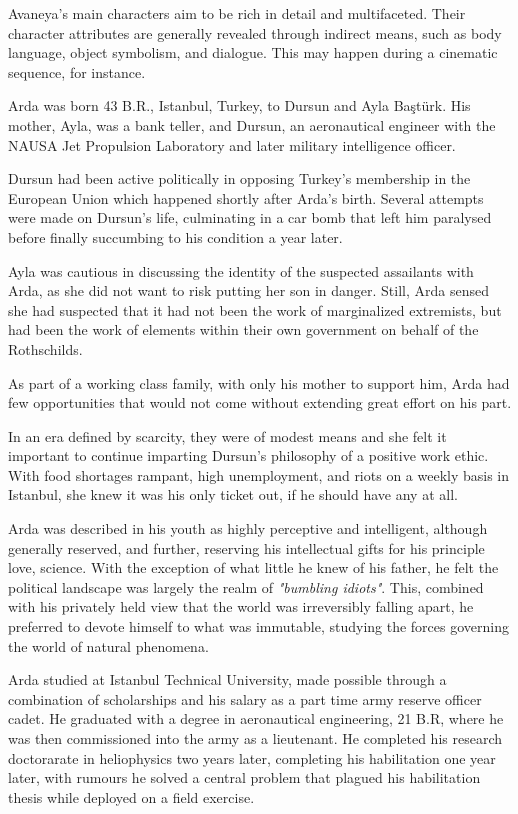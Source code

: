 
Avaneya's main characters aim to be rich in detail and multifaceted. Their character attributes are generally revealed through indirect means, such as body language, object symbolism, and dialogue. This may happen during a cinematic sequence, for instance.

Arda was born 43 B.R., Istanbul, Turkey, to Dursun and Ayla Baştürk. His mother, Ayla, was a bank teller, and Dursun, an aeronautical engineer with the NAUSA Jet Propulsion Laboratory and later military intelligence officer.

Dursun had been active politically in opposing Turkey's membership in the European Union which happened shortly after Arda's birth. Several attempts were made on Dursun's life, culminating in a car bomb that left him paralysed before finally succumbing to his condition a year later.

Ayla was cautious in discussing the identity of the suspected assailants with Arda, as she did not want to risk putting her son in danger. Still, Arda sensed she had suspected that it had not been the work of marginalized extremists, but had been the work of elements within their own government on behalf of the Rothschilds.

As part of a working class family, with only his mother to support him, Arda had few opportunities that would not come without extending great effort on his part. 

In an era defined by scarcity, they were of modest means and she felt it important to continue imparting Dursun's philosophy of a positive work ethic. With food shortages rampant, high unemployment, and riots on a weekly basis in Istanbul, she knew it was his only ticket out, if he should have any at all.

Arda was described in his youth as highly perceptive and intelligent, although generally reserved, and further, reserving his intellectual gifts for his principle love, science. With the exception of what little he knew of his father, he felt the political landscape was largely the realm of {\it "bumbling idiots"}. This, combined with his privately held view that the world was irreversibly falling apart, he preferred to devote himself to what was immutable, studying the forces governing the world of natural phenomena.

Arda studied at Istanbul Technical University, made possible through a combination of scholarships and his salary as a part time army reserve officer cadet. He graduated with a degree in aeronautical engineering, 21 B.R, where he was then commissioned into the army as a lieutenant. He completed his research doctorarate in heliophysics two years later, completing his habilitation one year later, with rumours he solved a central problem that plagued his habilitation thesis while deployed on a field exercise.


